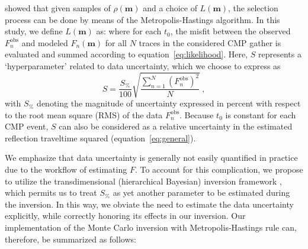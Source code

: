 \cite{mosetaran} showed that given samples of $\rho(\mathbf{m})$ and a choice of $L(\mathbf{m})$, the selection process can be done by means of the Metropolis-Hastings algorithm. In this study, we define $L(\mathbf{m})$ as:
where for each $t_0$, the misfit between the observed $F^{\text{obs}}_n$ and modeled $F_n(\mathbf{m})$ for all $N$ traces in the considered CMP gather is evaluated and summed according to equation~\ref{eq:likelihood}. Here, $S$ represents a `hyperparameter' related to data uncertainty, which we choose to express as
\begin{equation}
    \label{eq:noise}
    S = \frac{S_{\%}}{100} \sqrt{\frac{\sum^{N}_{n=1} (F^{\text{obs}}_n)^2}{N}}~,
\end{equation}
with $S_{\%}$ denoting the magnitude of uncertainty expressed in percent with respect to the root mean square (RMS) of the data $F^{\text{obs}}_n$. Because $t_0$ is constant for each CMP event, $S$ can also be considered as a relative uncertainty in the estimated reflection traveltime squared (equation~\ref{eq:general}).

We emphasize that data uncertainty is generally not easily quantified in practice due to the workflow of estimating $F$. To account for this complication, we propose to utilize the transdimensional (hierarchical Bayesian) inversion framework \cite[]{malinverno,sambridgetrans1,sambridgetrans2}, which permits us to treat $S_{\%}$ as yet another parameter to be estimated during the inversion. In this way, we obviate the need to estimate the data uncertainty explicitly, while correctly honoring its effects in our inversion. Our implementation of the Monte Carlo inversion with Metropolis-Hastings rule can, therefore, be summarized as follows:

